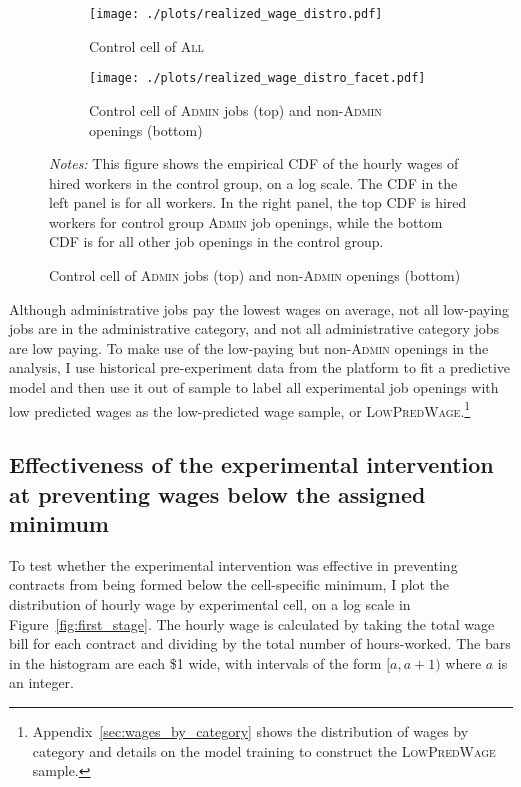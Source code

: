 \documentclass[AER]{AEA}
\newcommand{\all}{\textsc{All}}
\newcommand{\admin}{\textsc{Admin}}
\newcommand{\lpw}{\textsc{LowPredWage}}
\begin{document}
\begin{figure}[ht]
\centering 
\caption{Empirical CDFs of hired workers in the control group \label{fig:wage_distro}} 
\begin{subfigure}{0.50 \textwidth}
  \texttt{[image: ./plots/realized\_wage\_distro.pdf]}
  \caption{Control cell of \all{}}
\end{subfigure}%
\begin{subfigure}{0.50 \textwidth}
  \texttt{[image: ./plots/realized\_wage\_distro\_facet.pdf]}
    \caption{Control cell of \admin{} jobs (top) and non-\admin{} openings (bottom)}
\end{subfigure} 
\begin{minipage}{0.95\linewidth}
{\footnotesize
\emph{Notes:} 
This figure shows the empirical CDF of the hourly wages of hired workers in the control group, on a log scale. 
The CDF in the left panel is for all workers. 
In the right panel, the top CDF is hired workers for control group \admin{} job openings, while the bottom CDF is for all other job openings in the control group. 
}
\end{minipage} 
\end{figure} 

Although administrative jobs pay the lowest wages on average, not all low-paying jobs are in the administrative category, and not all administrative category jobs are low paying.
To make use of the low-paying but  non-\admin{} openings in the analysis, I use historical pre-experiment data from the platform to fit a predictive model and then use it out of sample to label all experimental job openings with low predicted wages as the low-predicted wage sample, or \lpw{}.\footnote{
 Appendix~\ref{sec:wages_by_category} shows the distribution of wages by category and details on the model training to construct the \lpw{} sample. 
}

\subsection{Effectiveness of the experimental intervention at preventing wages below the assigned minimum}

To test whether the experimental intervention was effective in preventing contracts from being formed below the cell-specific minimum, I plot the distribution of hourly wage by experimental cell, on a log scale in Figure~\ref{fig:first_stage}. 
The hourly wage is calculated by taking the total wage bill for each contract and dividing by the total number of hours-worked.
The bars in the histogram are each \$1 wide, with intervals of the form $[a, a + 1)$ where $a$ is an integer. 
\end{document}
